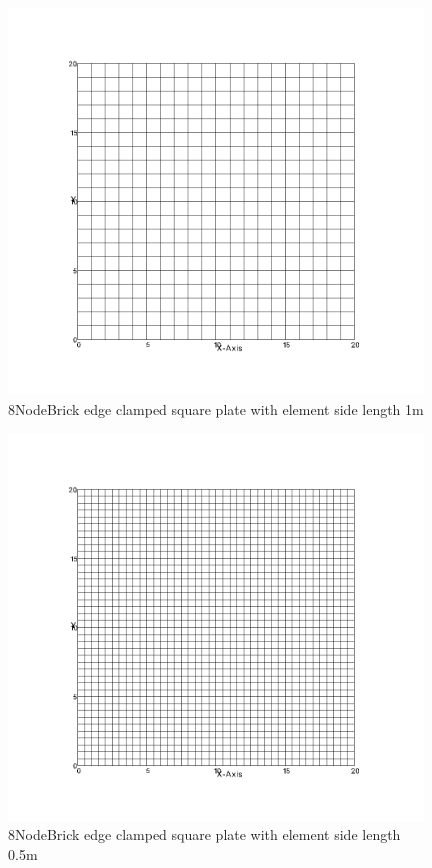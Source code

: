 \documentclass[fleqn,11pt,letter]{article}
\begin{document}
\newpage

\begin{figure}[H]
  \centering
  \includegraphics[width=11cm]{../Figure_files/8NodeBrick/square_plate4.png}
  \caption{8NodeBrick edge clamped square plate with element side length 1m }
  \label{fig 8NodeBrick edges clamped square plate with element side length 1m }
\end{figure}


\begin{figure}[H]
  \centering
  \includegraphics[width=11cm]{../Figure_files/8NodeBrick/square_plate5.png}
  \caption{8NodeBrick edge clamped square plate with element side length 0.5m }
  \label{fig 8NodeBrick edges clamped square plate with element side length 0.5m }
\end{figure}
\end{document}
